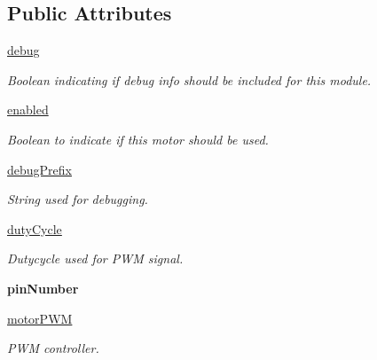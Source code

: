 \subsection*{Public Attributes}
\begin{DoxyCompactItemize}
\item 
\mbox{\label{classmcs_1_1firmware_1_1MD30C_1_1MD30C_ac33a3742c7f5636d9965ea8130c26db1}} 
\hyperlink{classmcs_1_1firmware_1_1MD30C_1_1MD30C_ac33a3742c7f5636d9965ea8130c26db1}{debug}
\begin{DoxyCompactList}\small\item\em Boolean indicating if debug info should be included for this module. \end{DoxyCompactList}\item 
\hyperlink{classmcs_1_1firmware_1_1MD30C_1_1MD30C_a9c50566408c97597c1fa717f2381618b}{enabled}
\begin{DoxyCompactList}\small\item\em Boolean to indicate if this motor should be used. \end{DoxyCompactList}\item 
\mbox{\label{classmcs_1_1firmware_1_1MD30C_1_1MD30C_ab1c251bfb0483f3d382b7960f33ee093}} 
\hyperlink{classmcs_1_1firmware_1_1MD30C_1_1MD30C_ab1c251bfb0483f3d382b7960f33ee093}{debug\+Prefix}
\begin{DoxyCompactList}\small\item\em String used for debugging. \end{DoxyCompactList}\item 
\hyperlink{classmcs_1_1firmware_1_1MD30C_1_1MD30C_a26fa2e2b048c990aead0201e2eece808}{duty\+Cycle}
\begin{DoxyCompactList}\small\item\em Dutycycle used for P\+WM signal. \end{DoxyCompactList}\item 
\mbox{\label{classmcs_1_1firmware_1_1MD30C_1_1MD30C_a832e5fbad736df0667c3e2657e9f1043}} 
{\bfseries pin\+Number}
\item 
\mbox{\label{classmcs_1_1firmware_1_1MD30C_1_1MD30C_ad7b4a6630bc7e884d0aea66668ba8553}} 
\hyperlink{classmcs_1_1firmware_1_1MD30C_1_1MD30C_ad7b4a6630bc7e884d0aea66668ba8553}{motor\+P\+WM}
\begin{DoxyCompactList}\small\item\em P\+WM controller. \end{DoxyCompactList}\end{DoxyCompactItemize}


